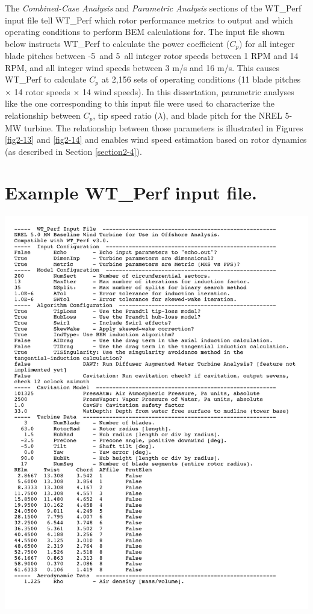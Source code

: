 The \textit{Combined-Case Analysis} and \textit{Parametric Analysis} sections of the WT\_Perf input file tell WT\_Perf which rotor performance metrics to output and which operating conditions to perform BEM calculations for. The input file shown below instructs WT\_Perf to calculate the power coefficient ($C_p$) for all integer blade pitches between -5\degree\ and 5\degree\, all integer rotor speeds between 1 RPM and 14 RPM, and all integer wind speeds between 3 m/s and 16 m/s. This causes WT\_Perf to calculate $C_p$ at 2,156 sets of operating conditions (11 blade pitches $\times$ 14 rotor speeds $\times$ 14 wind speeds). In this dissertation, parametric analyses like the one corresponding to this input file were used to characterize the relationship between $C_p$, tip speed ratio ($\lambda$), and blade pitch for the NREL 5-MW turbine. The relationship between those parameters is illustrated in Figures \ref{fig2-13} and \ref{fig2-14} and enables wind speed estimation based on rotor dynamics (as described in Section \ref{section2-4}).

\pagebreak
\section{Example WT\_Perf input file.} \label{sectionE-1}

\noindent
\includegraphics[width=\linewidth]{Figures/AppendixEFigures/figE-2.pdf}	

